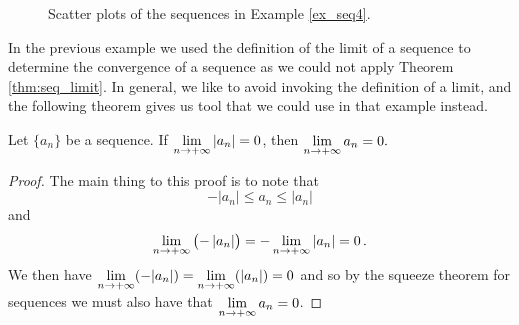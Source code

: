 \begin{figure}
\centering
\qquad
{}
\qquad
{}
\caption{Scatter plots of the sequences in Example \ref{ex_seq4}.}
\end{figure}

In the previous example we used the definition of the limit of a sequence to determine the convergence of a sequence as we could not apply Theorem \ref{thm:seq_limit}. In general, we like to avoid invoking the definition of a limit, and the following theorem gives us tool that we could use in that example instead.


\begin{theorem}\label{thm:abs_val_seq}
Let $\{a_n\}$ be a sequence. If $\displaystyle \lim_{n\to+\infty} |a_n| = 0$, then $\displaystyle \lim_{n\to+\infty} a_n = 0.$
\end{theorem}
\ifanalysis

\begin{proof}
The main thing to this proof is to note that
$$
- \left| {{a_n}} \right| \le {a_n} \le \left| {{a_n}} \right|
$$
and
$$
 \displaystyle\lim \limits_{n \to +\infty } \left( { - \left| {{a_n}} \right|} \right) =  -  \lim \limits_{n \to +\infty } \left| {{a_n}} \right| = 0\,.
$$
We then have  $\displaystyle\lim\limits_{n \to +\infty }(-|a_n|)=\lim\limits_{n \to +\infty }(|a_n|)=0$ and so by the squeeze theorem for sequences we must also have that $\displaystyle\lim \limits_{n \to +\infty } {a_n} = 0$.
\end{proof}

